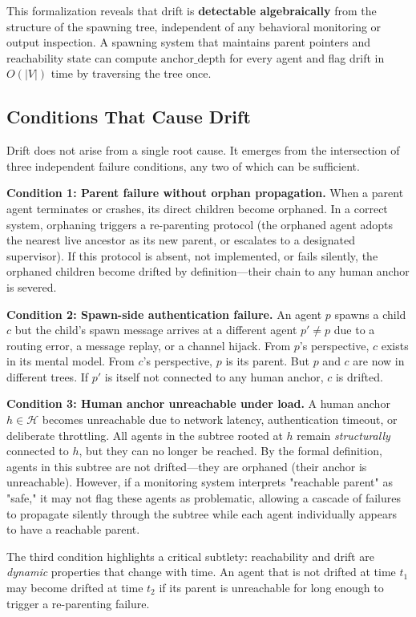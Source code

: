 This formalization reveals that drift is \textbf{detectable algebraically} from the structure of the spawning tree, independent of any behavioral monitoring or output inspection. A spawning system that maintains parent pointers and reachability state can compute $\text{anchor\_depth}$ for every agent and flag drift in $O(|V|)$ time by traversing the tree once.

\subsection{Conditions That Cause Drift}

Drift does not arise from a single root cause. It emerges from the intersection of three independent failure conditions, any two of which can be sufficient.

\textbf{Condition 1: Parent failure without orphan propagation.}
When a parent agent terminates or crashes, its direct children become orphaned. In a correct system, orphaning triggers a re-parenting protocol (the orphaned agent adopts the nearest live ancestor as its new parent, or escalates to a designated supervisor). If this protocol is absent, not implemented, or fails silently, the orphaned children become drifted by definition—their chain to any human anchor is severed.

\textbf{Condition 2: Spawn-side authentication failure.}
An agent $p$ spawns a child $c$ but the child's spawn message arrives at a different agent $p' \neq p$ due to a routing error, a message replay, or a channel hijack. From $p$'s perspective, $c$ exists in its mental model. From $c$'s perspective, $p$ is its parent. But $p$ and $c$ are now in different trees. If $p'$ is itself not connected to any human anchor, $c$ is drifted.

\textbf{Condition 3: Human anchor unreachable under load.}
A human anchor $h \in \mathcal{H}$ becomes unreachable due to network latency, authentication timeout, or deliberate throttling. All agents in the subtree rooted at $h$ remain \emph{structurally} connected to $h$, but they can no longer be reached. By the formal definition, agents in this subtree are not drifted—they are orphaned (their anchor is unreachable). However, if a monitoring system interprets "reachable parent" as "safe," it may not flag these agents as problematic, allowing a cascade of failures to propagate silently through the subtree while each agent individually appears to have a reachable parent.

The third condition highlights a critical subtlety: reachability and drift are \emph{dynamic} properties that change with time. An agent that is not drifted at time $t_1$ may become drifted at time $t_2$ if its parent is unreachable for long enough to trigger a re-parenting failure.

